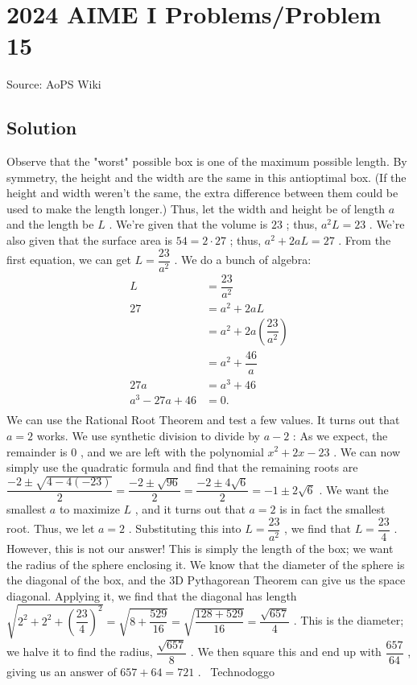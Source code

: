 \documentclass[12pt]{article}
\begin{document}
\section*{{2024 AIME I Problems/Problem 15}}
Source: AoPS Wiki

\subsection*{Solution}
Observe that the "worst" possible box is one of the maximum possible length.
By symmetry, the height and the width are the same in this antioptimal box. (If the height and width weren't the same, the extra difference between them could be used to make the length longer.) Thus, let the width and height be of length $a$ and the length be $L$ . We're given that the volume is $23$ ; thus, $a^2L=23$ . We're also given that the surface area is $54=2\cdot27$ ; thus, $a^2+2aL=27$ . From the first equation, we can get $L=\dfrac{23}{a^2}$ . We do a bunch of algebra: \begin{align*}
L&=\dfrac{23}{a^2} \\
27&=a^2+2aL \\
&=a^2+2a\left(\dfrac{23}{a^2}\right) \\
&=a^2+\dfrac{46}a \\
27a&=a^3+46 \\
a^3-27a+46&=0. \\
\end{align*} We can use the Rational Root Theorem and test a few values. It turns out that $a=2$ works. We use synthetic division to divide by $a-2$ : As we expect, the remainder is $0$ , and we are left with the polynomial $x^2+2x-23$ . We can now simply use the quadratic formula and find that the remaining roots are $\dfrac{-2\pm\sqrt{4-4(-23)}}2=\dfrac{-2\pm\sqrt{96}}2=\dfrac{-2\pm4\sqrt{6}}2=-1\pm2\sqrt6$ . We want the smallest $a$ to maximize $L$ , and it turns out that $a=2$ is in fact the smallest root. Thus, we let $a=2$ . Substituting this into $L=\dfrac{23}{a^2}$ , we find that $L=\dfrac{23}4$ . However, this is not our answer! This is simply the length of the box; we want the radius of the sphere enclosing it. We know that the diameter of the sphere is the diagonal of the box, and the 3D Pythagorean Theorem can give us the space diagonal. Applying it, we find that the diagonal has length $\sqrt{2^2+2^2+\left(\dfrac{23}4\right)^2}=\sqrt{8+\dfrac{529}{16}}=\sqrt{\dfrac{128+529}{16}}=\dfrac{\sqrt{657}}4$ . This is the diameter; we halve it to find the radius, $\dfrac{\sqrt{657}}8$ . We then square this and end up with $\dfrac{657}{64}$ , giving us an answer of $657+64=\boxed{721}$ . ~Technodoggo
\end{document}
